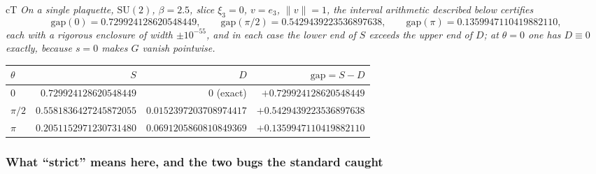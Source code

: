 \begin{claimbox}{cT}
\emph{On a single plaquette, $\mathrm{SU}(2)$, $\beta=2.5$, slice $\xi_{3}=0$, $v=e_{3}$,
$\|v\|=1$, the interval arithmetic described below certifies}
\begin{equation}
\mathrm{gap}(0)=0.729924128620548449,\qquad
\mathrm{gap}(\pi/2)=0.5429439223536897638,\qquad
\mathrm{gap}(\pi)=0.1359947110419882110,
\label{eq:h1s-points}
\end{equation}
\emph{each with a rigorous enclosure of width $\pm10^{-55}$, and in each case the lower end of $S$
exceeds the upper end of $D$; at $\theta=0$ one has $D\equiv0$ exactly, because $s=0$ makes $G$
vanish pointwise.} \LT{}
\end{claimbox}


\begin{center}
\footnotesize
\begin{tabular}{@{}lrrr@{}}
\toprule
$\theta$ & $S$ & $D$ & $\mathrm{gap}=S-D$\\
\midrule
$0$      & $0.729924128620548449$ & $0$ (exact) & $\mathbf{+0.729924128620548449}$\\
$\pi/2$  & $0.5581836427245872055$ & $0.0152397203708974417$ & $\mathbf{+0.5429439223536897638}$\\
$\pi$    & $0.2051152971230731480$ & $0.0691205860810849369$ & $\mathbf{+0.1359947110419882110}$\\
\bottomrule
\end{tabular}
\end{center}

\subsubsection*{What ``strict'' means here, and the two bugs the standard caught}

